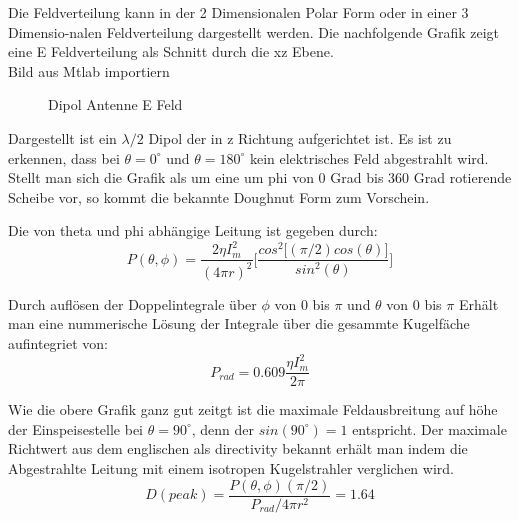 Die Feldverteilung kann in der 2 Dimensionalen Polar Form oder in einer 3 Dimensio-nalen Feldverteilung dargestellt werden.
Die nachfolgende Grafik zeigt eine E Feldverteilung als Schnitt durch die xz Ebene.\\
Bild aus Mtlab importiern\\
\begin{figure}
\begin{center}
\end{center}
	\caption{Dipol Antenne E Feld}
	\label{DipolEFerd}
\end{figure}
Dargestellt ist ein $\lambda/2$ Dipol der in z Richtung aufgerichtet ist. Es ist zu erkennen, dass bei $\theta = 0 ^\circ $  und $\theta = 180 ^\circ $ kein elektrisches Feld abgestrahlt wird. Stellt man sich die Grafik als um eine um phi von 0 Grad bis 360 Grad rotierende Scheibe vor, so kommt die bekannte Doughnut Form zum Vorschein.

Die von theta und phi abhängige Leitung ist gegeben durch:
\begin{equation}
P(\theta,\phi)=\frac{2\eta I_{m}^{2}}{(4\pi r)^{2}}\lbrack \frac{cos^{2}\lbrack (\pi/2) cos(\theta)\rbrack}{sin^{2}(\theta)}\rbrack
\end{equation}

Durch auflösen der Doppelintegrale über $\phi$ von 0 bis $\pi$  und $\theta$ von 0 bis $\pi$ Erhält man eine nummerische Lösung der Integrale über die gesammte Kugelfäche aufintegriet von: 
\begin{equation}
P_{rad}=0.609 \frac{\eta I_{m}^{2}}{2\pi}
\end{equation}

Wie die obere Grafik ganz gut zeitgt ist die maximale Feldausbreitung auf höhe der Einspeisestelle bei $\theta = 90 ^\circ $, denn der  $sin(90 ^\circ ) =1$ entspricht.
Der maximale Richtwert  aus dem englischen als directivity bekannt erhält man indem die Abgestrahlte Leitung mit einem isotropen Kugelstrahler verglichen wird.
\begin{equation}
D(peak)=\frac{P(\theta,\phi)(\pi/2)}{P_{rad}/ 4 \pi r^{2}} =1.64
\label{eq:Directivity}
\end{equation}

